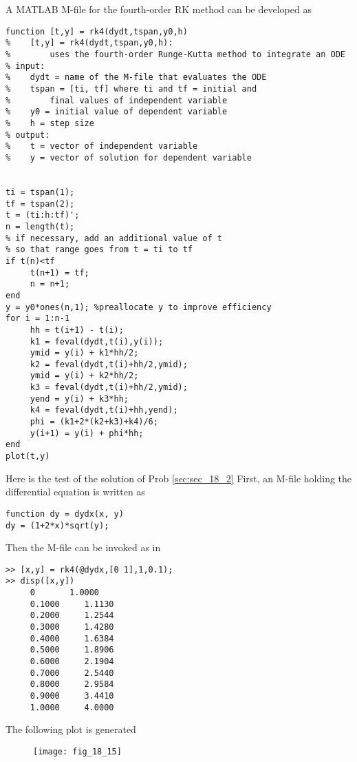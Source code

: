 \documentclass[../main.tex]{subfiles}
\begin{document}
\section{}
	\bigbreak
A MATLAB M-file for the fourth-order RK method can be developed as
	\bigbreak
\begin{lstlisting}[numbers=none]
function [t,y] = rk4(dydt,tspan,y0,h)
%	 [t,y] = rk4(dydt,tspan,y0,h):
%		 uses the fourth-order Runge-Kutta method to integrate an ODE
% input:
%	 dydt = name of the M-file that evaluates the ODE
%	 tspan = [ti, tf] where ti and tf = initial and
%		 final values of independent variable
%	 y0 = initial value of dependent variable
%	 h = step size
% output:
%	 t = vector of independent variable
%	 y = vector of solution for dependent variable


ti = tspan(1);
tf = tspan(2);
t = (ti:h:tf)';
n = length(t);
% if necessary, add an additional value of t
% so that range goes from t = ti to tf
if t(n)<tf
	 t(n+1) = tf;
	 n = n+1;
end
y = y0*ones(n,1); %preallocate y to improve efficiency
for i = 1:n-1
	 hh = t(i+1) - t(i);
	 k1 = feval(dydt,t(i),y(i));
	 ymid = y(i) + k1*hh/2;
	 k2 = feval(dydt,t(i)+hh/2,ymid);
	 ymid = y(i) + k2*hh/2;
	 k3 = feval(dydt,t(i)+hh/2,ymid);
	 yend = y(i) + k3*hh;
	 k4 = feval(dydt,t(i)+hh,yend);
	 phi = (k1+2*(k2+k3)+k4)/6;
	 y(i+1) = y(i) + phi*hh;
end
plot(t,y) 
\end{lstlisting}
	\bigbreak
Here is the test of the solution of Prob \ref{sec:sec_18_2} First, an M-file holding the differential
equation is written as
	\bigbreak
\begin{lstlisting}[numbers=none]
function dy = dydx(x, y)
dy = (1+2*x)*sqrt(y);
\end{lstlisting}
	\bigbreak
Then the M-file can be invoked as in 
	\bigbreak
\begin{lstlisting}[numbers=none]
>> [x,y] = rk4(@dydx,[0 1],1,0.1);
>> disp([x,y])
	 0		 1.0000
	 0.1000 	1.1130
	 0.2000 	1.2544
	 0.3000 	1.4280
	 0.4000 	1.6384
	 0.5000 	1.8906
	 0.6000 	2.1904
	 0.7000 	2.5440
	 0.8000 	2.9584
	 0.9000 	3.4410
	 1.0000 	4.0000
\end{lstlisting}
	\bigbreak
The following plot is generated
	\bigbreak
	\begin{figure}[H]
		\texttt{[image: fig\_18\_15]}
		\label{fig:fig_18_15}
	\end{figure}
	\bigbreak
\end{document}
